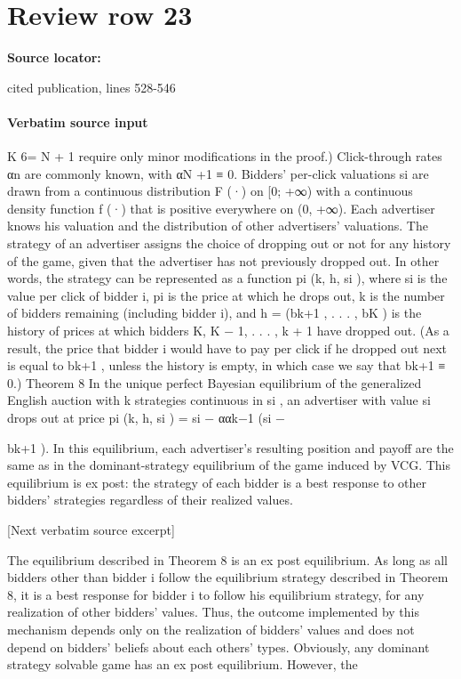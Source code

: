 \documentclass[10pt]{article}
\begin{document}
\section*{Review row 23}
\textbf{Source locator:} {\footnotesize\raggedright cited publication, lines 528-\allowbreak{}546\par}
\paragraph{Verbatim source input}
\begin{ReviewVerbatim}
K 6= N + 1 require only minor modifications in the proof.) Click-through rates αn are commonly
known, with αN +1 ≡ 0. Bidders’ per-click valuations si are drawn from a continuous distribution
F (·) on [0; +∞) with a continuous density function f (·) that is positive everywhere on (0, +∞).
Each advertiser knows his valuation and the distribution of other advertisers’ valuations.
The strategy of an advertiser assigns the choice of dropping out or not for any history of the
game, given that the advertiser has not previously dropped out. In other words, the strategy can be
represented as a function pi (k, h, si ), where si is the value per click of bidder i, pi is the price at which
he drops out, k is the number of bidders remaining (including bidder i), and h = (bk+1 , . . . , bK ) is
the history of prices at which bidders K, K − 1, . . . , k + 1 have dropped out. (As a result, the
price that bidder i would have to pay per click if he dropped out next is equal to bk+1 , unless the
history is empty, in which case we say that bk+1 ≡ 0.)
Theorem 8 In the unique perfect Bayesian equilibrium of the generalized English auction with
k
strategies continuous in si , an advertiser with value si drops out at price pi (k, h, si ) = si − ααk−1
(si −

bk+1 ). In this equilibrium, each advertiser’s resulting position and payoff are the same as in the
dominant-strategy equilibrium of the game induced by VCG. This equilibrium is ex post: the strategy
of each bidder is a best response to other bidders’ strategies regardless of their realized values.

[Next verbatim source excerpt]

The equilibrium described in Theorem 8 is an ex post equilibrium. As long as all bidders other
than bidder i follow the equilibrium strategy described in Theorem 8, it is a best response for bidder
i to follow his equilibrium strategy, for any realization of other bidders’ values. Thus, the outcome
implemented by this mechanism depends only on the realization of bidders’ values and does not
depend on bidders’ beliefs about each others’ types.
Obviously, any dominant strategy solvable game has an ex post equilibrium. However, the
\end{ReviewVerbatim}
\end{document}
